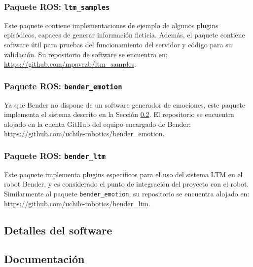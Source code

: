 \subsubsection{Paquete ROS: \texttt{ltm\_samples}}

Este paquete contiene implementaciones de ejemplo de algunos plugins episódicos, capaces de generar información ficticia. Además, el paquete contiene software útil para pruebas del funcionamiento del servidor y código para su validación. Su repositorio de software se encuentra en: \url{https://github.com/mpavezb/ltm\_samples}.

\subsubsection{Paquete ROS: \texttt{bender\_emotion}}

Ya que Bender no dispone de un software generador de emociones, este paquete implementa el sistema descrito en la Sección \ref{}. El repositorio se encuentra alojado en la cuenta GitHub del equipo encargado de Bender: \url{https://github.com/uchile-robotics/bender\_emotion}.

\subsubsection{Paquete ROS: \texttt{bender\_ltm}}

Este paquete implementa plugins específicos para el uso del sistema LTM en el robot Bender, y es considerado el punto de integración del proyecto con el robot. Similarmente al paquete \texttt{bender\_emotion}, su repositorio se encuentra alojado en: \url{https://github.com/uchile-robotics/bender\_ltm}.




\subsection{Detalles del software}





\subsection{Documentación}

